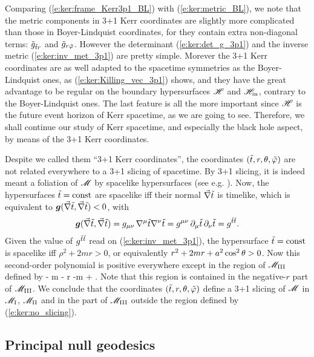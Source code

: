 Comparing (\ref{e:ker:frame_Kerr3p1_BL}) with (\ref{e:ker:metric_BL}), we
note that the metric components in 3+1 Kerr coordinates are slightly more
complicated than those in Boyer-Lindquist coordinates, for they contain
extra non-diagonal terms: ${\tilde g}_{{\tilde t} r}$ and ${\tilde g}_{r {\tilde\varphi}}$. However
the determinant (\ref{e:ker:det_g_3p1})
and the inverse metric (\ref{e:ker:inv_met_3p1}) are pretty simple. Morever
the 3+1 Kerr coordinates are as well adapted to the spacetime symmetries
as the Boyer-Lindquist ones, as (\ref{e:ker:Killing_vec_3p1}) shows, and
they have the great advantage to be regular on the boundary hypersurfaces
$\mathscr{H}$ and $\mathscr{H}_{\rm in}$, contrary to the Boyer-Lindquist ones.
The last feature is all the more important since
$\mathscr{H}$ is the future event horizon of Kerr spacetime,
as we are going to see.
Therefore, we shall continue our study of Kerr spacetime, and especially the
black hole aspect, by means of the 3+1 Kerr coordinates.

\begin{remark} \label{r:ker:Kerr_slicing}
Despite we called them ``3+1 Kerr coordinates'', the coordinates
$({\tilde t},r,\theta,{\tilde\varphi})$ are not related everywhere to a 3+1 slicing of
spacetime. By 3+1 slicing, it is indeed meant a foliation of $\mathscr{M}$
by spacelike hypersurfaces (see e.g. \cite{Gourg12}). Now, the hypersurfaces
${\tilde t} = \mathrm{const}$ are spacelike iff their normal $\vec{\nabla} {\tilde t}$ is timelike, which
is equivalent to $\bm{g}(\vec{\nabla} {\tilde t}, \vec{\nabla} {\tilde t}) < 0$, with
\[
    \bm{g}(\vec{\nabla} {\tilde t}, \vec{\nabla} {\tilde t}) = g_{\mu\nu} \, \nabla^\mu {\tilde t} \nabla^\nu {\tilde t}
    = g^{\mu\nu}\,  \partial_\mu {\tilde t} \, \partial_\nu {\tilde t} = g^{{\tilde t}{\tilde t}} .
\]
Given the value of $g^{{\tilde t}{\tilde t}}$ read on (\ref{e:ker:inv_met_3p1}), the hypersurface
${\tilde t}=\mathrm{const}$ is spacelike iff $\rho^2+2mr > 0$, or equivalently
$r^2 + 2 mr + a^2\cos^2\theta > 0$. Now this second-order polynomial is positive everywhere except in the region of $\mathscr{M}_{\rm III}$ defined by
\be \label{e:ker:no_slicing}
    - m -  \leq r \leq -m +  .
\ee
Note that this region is contained in the negative-$r$ part of $\mathscr{M}_{\rm III}$.
We conclude that the coordinates $({\tilde t},r,\theta,{\tilde\varphi})$ define a 3+1 slicing of $\mathscr{M}$
in $\mathscr{M}_{\rm I}$, $\mathscr{M}_{\rm II}$ and in the part of $\mathscr{M}_{\rm III}$ outside the
region defined by (\ref{e:ker:no_slicing}).
\end{remark}

\subsection{Principal null geodesics} \label{s:ker:principal_geod}

